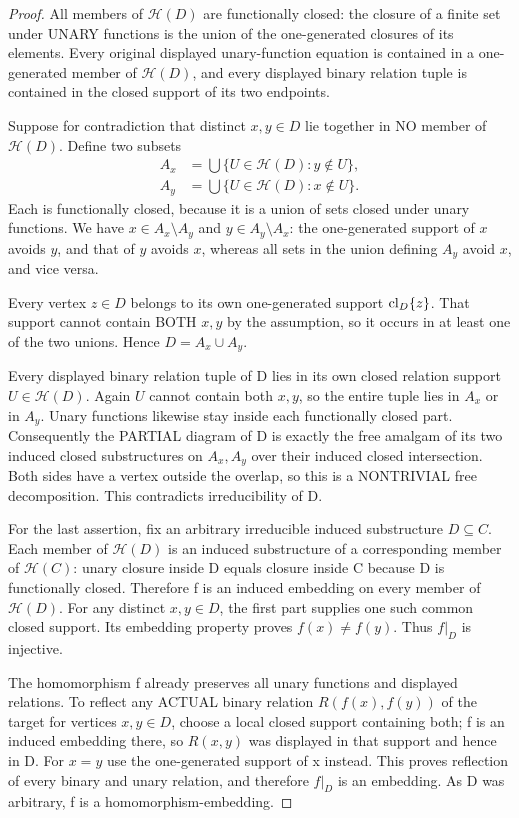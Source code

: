 \begin{proof}
All members of
\(\mathscr H(D)\)
are functionally closed:
the closure of a finite
set under UNARY
functions is the
union of the
one-generated closures
of its elements.
Every original
displayed unary-function
equation is contained
in a one-generated
member of
\(\mathscr H(D)\),
and every displayed
binary relation tuple
is contained in the
closed support of its
two endpoints.

Suppose for contradiction
that distinct \(x,y\in D\)
lie together in NO
member of
\(\mathscr H(D)\).
Define two subsets
\[
 \begin{aligned}
 A_x&=\bigcup\{U\in\mathscr H(D):
                              y\notin U\},\\
 A_y&=\bigcup\{U\in\mathscr H(D):
                              x\notin U\}.
 \end{aligned}
\]
Each is functionally
closed, because it is
a union of sets closed
under unary functions.
We have \(x\in A_x
\setminus A_y\)
and \(y\in A_y
\setminus A_x\):
the one-generated
support of \(x\)
avoids \(y\), and
that of \(y\) avoids
\(x\), whereas all
sets in the union
defining \(A_y\)
avoid \(x\), and
vice versa.

Every vertex \(z\in D\)
belongs to its own
one-generated support
\(\operatorname{cl}_D\{z\}\).
That support cannot
contain BOTH \(x,y\)
by the assumption,
so it occurs in at
least one of the two
unions. Hence
\(D=A_x\cup A_y\).

Every displayed binary
relation tuple of D
lies in its own
closed relation support
\(U\in\mathscr H(D)\).
Again \(U\) cannot
contain both \(x,y\),
so the entire tuple
lies in \(A_x\)
or in \(A_y\).
Unary functions likewise
stay inside each
functionally closed part.
Consequently the
PARTIAL diagram of D
is exactly the free
amalgam of its two
induced closed
substructures on
\(A_x,A_y\) over
their induced closed
intersection.
Both sides have
a vertex outside
the overlap, so
this is a NONTRIVIAL
free decomposition.
This contradicts
irreducibility of D.

For the last assertion,
fix an arbitrary
irreducible induced
substructure \(D\subseteq C\).
Each member of
\(\mathscr H(D)\)
is an induced
substructure of
a corresponding
member of
\(\mathscr H(C)\):
unary closure inside
D equals closure
inside C because
D is functionally
closed. Therefore
f is an induced
embedding on every
member of
\(\mathscr H(D)\).
For any distinct
\(x,y\in D\), the
first part supplies
one such common
closed support.
Its embedding property
proves \(f(x)\ne f(y)\).
Thus \(f|_D\) is
injective.

The homomorphism f
already preserves
all unary functions
and displayed relations.
To reflect any
ACTUAL binary relation
\(R(f(x),f(y))\)
of the target for
vertices \(x,y\in D\),
choose a local
closed support
containing both;
f is an induced
embedding there,
so \(R(x,y)\)
was displayed in
that support and
hence in D.
For \(x=y\) use
the one-generated
support of x instead.
This proves reflection
of every binary and
unary relation, and
therefore \(f|_D\)
is an embedding.
As D was arbitrary,
f is a
homomorphism-embedding.
\end{proof}


